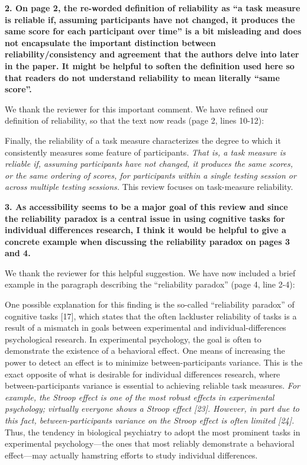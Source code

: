 \documentclass[a4paper,12pt]{article}
\begin{document}
\textbf{2. On page 2, the re-worded definition of reliability as ``a task measure is reliable if, assuming participants have not changed, it produces the same score for each participant over time'' is a bit misleading and does not encapsulate the important distinction between reliability/consistency and agreement that the authors delve into later in the paper. It might be helpful to soften the definition used here so that readers do not understand reliability to mean literally ``same score''.}

We thank the reviewer for this important comment. We have refined our definition of reliability, so that the text now reads (page 2, lines 10-12):

\begin{displayquote}
    Finally, the reliability of a task measure characterizes the degree to which it consistently measures some feature of participants. \textit{That is, a task measure is reliable if, assuming participants have not changed, it produces the same scores, or the same ordering of scores, for participants within a single testing session or across multiple testing sessions.} This review focuses on task-measure reliability.
\end{displayquote}

\textbf{3. As accessibility seems to be a major goal of this review and since the reliability paradox is a central issue in using cognitive tasks for individual differences research, I think it would be helpful to give a concrete example when discussing the reliability paradox on pages 3 and 4.}

We thank the reviewer for this helpful suggestion. We have now included a brief example in the paragraph describing the ``reliability paradox'' (page 4, line 2-4):

\begin{displayquote}
    One possible explanation for this finding is the so-called ``reliability paradox'' of cognitive tasks [17], which states that the often lackluster reliability of tasks is a result of a mismatch in goals between experimental and individual-differences psychological research. In experimental psychology, the goal is often to demonstrate the existence of a behavioral effect. One means of increasing the power to detect an effect is to minimize between-participants variance. This is the exact opposite of what is desirable for individual differences research, where between-participants variance is essential to achieving reliable task measures. \textit{For example, the Stroop effect is one of the most robust effects in experimental psychology; virtually everyone shows a Stroop effect [23]. However, in part due to this fact, between-participants variance on the Stroop effect is often limited [24].} Thus, the tendency in biological psychiatry to adopt the most prominent tasks in experimental psychology---the ones that most reliably demonstrate a behavioral effect---may actually hamstring efforts to study individual differences.
\end{displayquote}
\end{document}
